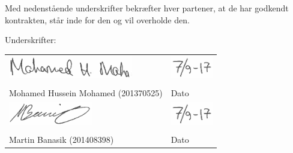 \newpage
Med nedenstående underskrifter bekræfter hver partener, at de har godkendt kontrakten, står inde for den og vil overholde den. 
 
Underskrifter:

\begin{vplace}[0.1]

\noindent \begin{tabular}{ll}
\includegraphics[height=1cm]{Figure/underskriftmohamed} & \includegraphics[height=1cm]{Figure/underskriftdato}\\
	\makebox[3in]{\hrulefill} & \makebox[1.5in]{\hrulefill}\\
	Mohamed Hussein Mohamed  (201370525) & Dato\\[9ex]
    \includegraphics[height=1cm]{Figure/underskriftmartin} & \includegraphics[height=1cm]{Figure/underskriftdato} \\
	\makebox[3in]{\hrulefill} & \makebox[1.5in]{\hrulefill}\\
	Martin Banasik  (201408398) & Dato\\[7ex]
		
\end{tabular}

\end{vplace}

